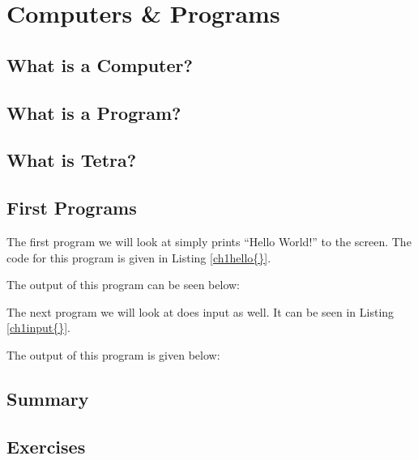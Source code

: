 \chapter{Computers \& Programs}


\section{What is a Computer?}






\section{What is a Program?}





\section{What is Tetra?}




\section{First Programs}

\def \codelabel {ch1hello}
The first program we will look at simply prints ``Hello World!'' to the screen.
The code for this program is given in Listing \ref{\codelabel{}}.
\def \codecaption{Hello World}


The output of this program can be seen below:





\def \codelabel {ch1input}
The next program we will look at does input as well.
It can be seen in Listing \ref{\codelabel{}}.
\def \codecaption{Asking for Input}



The output of this program is given below:



\section{Summary}


\section{Exercises}

